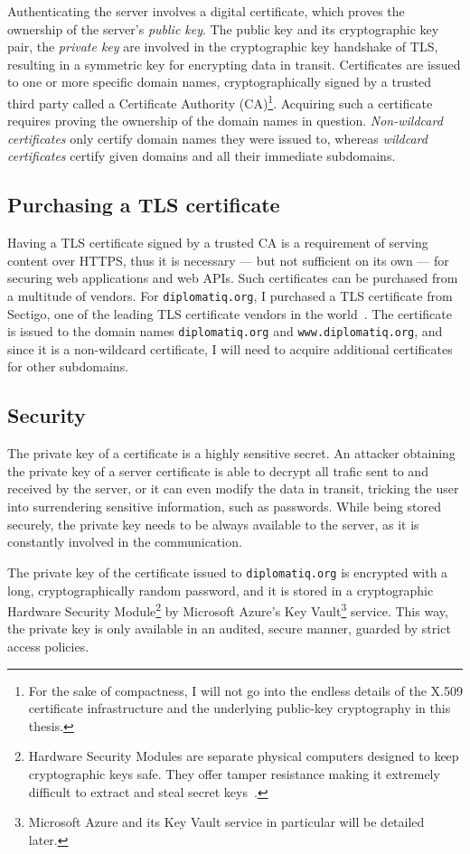 Authenticating the server involves a digital certificate, which proves the ownership of the server's \emph{public key}. The public key and its cryptographic key pair, the \emph{private key} are involved in the cryptographic key handshake of TLS, resulting in a symmetric key for encrypting data in transit. Certificates are issued to one or more specific domain names, cryptographically signed by a trusted third party called a Certificate Authority (CA)\footnote{For the sake of compactness, I will not go into the endless details of the X.509 certificate infrastructure and the underlying public-key cryptography in this thesis.}. Acquiring such a certificate requires proving the ownership of the domain names in question. \emph{Non-wildcard certificates} only certify domain names they were issued to, whereas \emph{wildcard certificates} certify given domains and all their immediate subdomains.

\subsection{Purchasing a TLS certificate}

Having a TLS certificate signed by a trusted CA is a requirement of serving content over HTTPS, thus it is necessary — but not sufficient on its own — for securing web applications and web APIs. Such certificates can be purchased from a multitude of vendors. For \lstinline{diplomatiq.org}, I purchased a TLS certificate from Sectigo, one of the leading TLS certificate vendors in the world~\cite{sectigo-website}. The certificate is issued to the domain names \lstinline{diplomatiq.org} and \lstinline{www.diplomatiq.org}, and since it is a non-wildcard certificate, I will need to acquire additional certificates for other subdomains.

\subsection{Security}

The private key of a certificate is a highly sensitive secret. An attacker obtaining the private key of a server certificate is able to decrypt all trafic sent to and received by the server, or it can even modify the data in transit, tricking the user into surrendering sensitive information, such as passwords. While being stored securely, the private key needs to be always available to the server, as it is constantly involved in the communication.

The private key of the certificate issued to \lstinline{diplomatiq.org} is encrypted with a long, cryptographically random password, and it is stored in a cryptographic Hardware Security Module\footnote{Hardware Security Modules are separate physical computers designed to keep cryptographic keys safe. They offer tamper resistance making it extremely difficult to extract and steal secret keys~\cite{fips-140-3}.} by Microsoft Azure's Key Vault\footnote{Microsoft Azure and its Key Vault service in particular will be detailed later.} service. This way, the private key is only available in an audited, secure manner, guarded by strict access policies.


